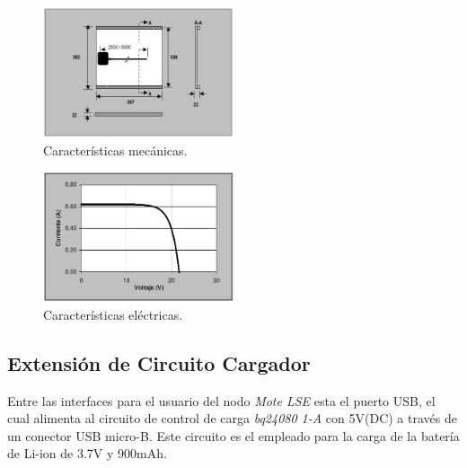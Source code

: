 {%

\begin{figure}[h!]
	\centering
    \includegraphics[width=0.5\textwidth]{./Figures/mecanicas.JPG}
    	\caption{Características mecánicas.}
	\label{fig:mecanicas}
\end{figure}

\begin{figure}[h!]
	\centering
    \includegraphics[width=0.5\textwidth]{./Figures/curva.JPG}
    	\caption{Características eléctricas.}
	\label{fig:curva}
\end{figure}

\subsection{Extensión de Circuito Cargador}
\label{subsec:extensión}
Entre las interfaces para el usuario del nodo \textit{Mote LSE} esta el puerto USB, el cual alimenta al circuito de control de carga \textit{bq24080 1-A} con 5V(DC) a través de un conector USB micro-B. Este circuito es el empleado para la carga de la batería de Li-ion de 3.7V y 900mAh.

}
